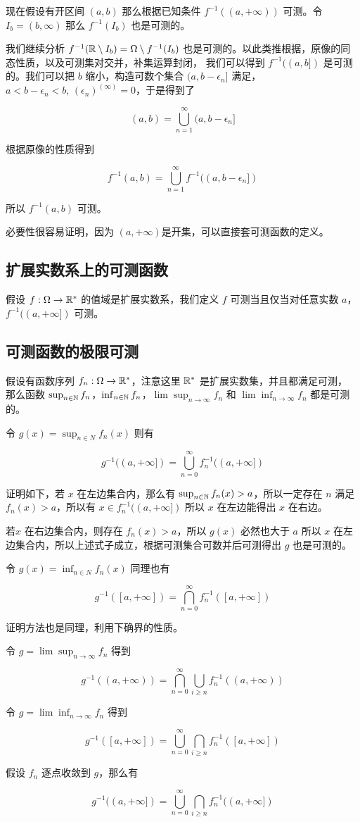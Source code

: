 现在假设有开区间 $(a,b)$ 那么根据已知条件 $f^{-1}((a,+\infty))$ 可测。令 $I_b = (b, \infty)$ 那么 $f^{-1}(I_b)$ 也是可测的。

我们继续分析 $f^{-1}(\mathbb{R} \setminus I_b) = \Omega \setminus f^{-1}(I_b)$ 也是可测的。以此类推根据，原像的同态性质，以及可测集对交并，补集运算封闭，
我们可以得到 $f^{-1}((a,b])$ 是可测的。我们可以把 $b$ 缩小，构造可数个集合 $(a, b - \epsilon_n]$ 满足，$a < b - \epsilon_n < b,\, (\epsilon_n)^{(\infty)} = 0$，于是得到了

\[
(a,b) = \bigcup_{n=1}^{\infty}(a, b - \epsilon_n]
\]

根据原像的性质得到

\[
f^{-1}(a,b) = \bigcup_{n=1}^{\infty} f^{-1}((a, b - \epsilon_n])
\]

所以 $f^{-1}(a,b)$ 可测。


必要性很容易证明，因为 $(a, +\infty)$是开集，可以直接套可测函数的定义。

\subsection{扩展实数系上的可测函数}

假设 $f: \Omega \to \mathbb{R}^*$ 的值域是扩展实数系，我们定义 $f$ 可测当且仅当对任意实数 $a$，$f^{-1}((a, +\infty])$ 可测。


\subsection{可测函数的极限可测}

假设有函数序列 $f_n: \Omega \to \mathbb{R}^*$，注意这里 $\mathbb{R}^*$ 是扩展实数集，并且都满足可测，
那么函数 $\sup_{n \in \mathbb{N}} f_n$，$\inf_{n \in \mathbb{N}}f_n$，$\lim \sup_{n \to \infty}f_n$ 和 
$\lim \inf_{n \to \infty}f_n$ 
都是可测的。

令 $g(x) = \sup_{n \in N}f_n(x)$ 则有

\[
g^{-1}((a, +\infty]) = \bigcup_{n = 0}^{\infty}f_n^{-1}((a, +\infty])
\]

证明如下，若 $x$ 在左边集合内，那么有 $\sup_{n \in \mathbb{N}}f_n(x) > a$，所以一定存在 $n$ 满足 $f_n(x) > a$，所以有 $x \in f_n^{-1}((a, +\infty])$
所以 $x$ 在左边能得出 $x$ 在右边。

若$x$ 在右边集合内，则存在 $f_n(x) > a$，所以 $g(x)$ 必然也大于 $a$ 所以 $x$ 在左边集合内，所以上述式子成立，根据可测集合可数并后可测得出 $g$ 也是可测的。


令 $g(x) = \inf_{n \in N}f_n(x)$ 同理也有

\[
g^{-1}([a, +\infty]) = \bigcap_{n = 0}^{\infty}f_n^{-1}([a, +\infty])
\]

证明方法也是同理，利用下确界的性质。

令 $g = \lim \sup_{n \to \infty}f_n$
得到

\[
g^{-1}((a, +\infty)) = \bigcap_{n = 0}^{\infty}\bigcup_{i \ge n}f_n^{-1}((a, +\infty))
\]


令 $g = \lim \inf_{n \to \infty}f_n$
得到

\[
g^{-1}([a, +\infty]) = \bigcup_{n = 0}^{\infty}\bigcap_{i \ge n}f_n^{-1}([a, +\infty])
\]

假设 $f_n$ 逐点收敛到 $g$，那么有

\[
g^{-1}((a, +\infty]) = \bigcup_{n = 0}^{\infty}\bigcap_{i \ge n}f_n^{-1}((a, +\infty])
\]